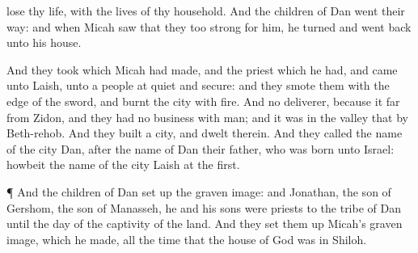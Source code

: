 {lose thy
life, with the
lives of thy
household.
And the
children of
Dan
went their
way: and when
Micah
saw that they
{} too
strong for him, he
turned and went
back unto his
house.
\par }{\PP {}And they
took
{} which
Micah had
made, and the
priest which he had, and
came unto
Laish, unto a
people
{} at
quiet and
secure: and they
smote them with the
edge of the
sword, and
burnt the
city with
fire.
And
{} no
deliverer, because it
{}
far from
Zidon, and they had no
business with
{}
man; and it was in the
valley that
{} by
Beth-rehob. And they
built a
city, and
dwelt therein.
And they
called the
name of the
city
Dan, after the
name of
Dan their
father, who was
born unto
Israel:
howbeit the
name of the
city
{}
Laish at the
first.
\par }{\PP {}¶ And the
children of
Dan set
up the graven
image: and
Jonathan, the
son of
Gershom, the
son of
Manasseh, he and his
sons were
priests to the
tribe of
Dan until the
day of the
captivity of the
land.
And they set them
up
Micah’s graven
image, which he
made, all the
time that the
house of
God was in
Shiloh.

}
